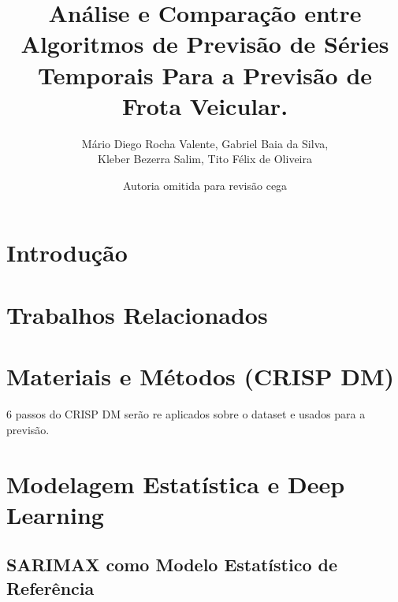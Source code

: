 \documentclass[12pt,a4paper]{article}
\title{Análise e Comparação entre Algoritmos de Previsão de Séries Temporais Para a Previsão de Frota Veicular.}
\author{Mário Diego Rocha Valente\inst{1}, Gabriel Baia da Silva\inst{2}, \\
Kleber Bezerra Salim\inst{1}, Tito Félix de Oliveira\inst{3}}
\author{Autoria omitida para revisão cega}
\begin{document}
\maketitle
\thispagestyle{empty}


\begin{abstract}

\end{abstract}

\begin{resumo}

\end{resumo}

\newpage


\section{Introdução}



\section{Trabalhos Relacionados}



\section{Materiais e Métodos (CRISP DM)}

6 passos do CRISP DM serão re aplicados sobre o dataset e usados para a previsão.

\section{Modelagem Estatística e Deep Learning}

\subsection{SARIMAX como Modelo Estatístico de Referência}
\end{document}
